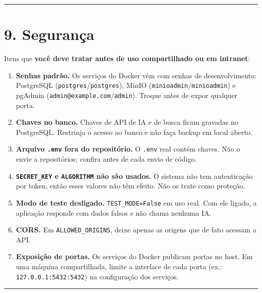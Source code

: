 \documentclass[
  brazilian,
  a4paper,12pt,oneside]{report}
\providecommand{\tightlist}{%
  \setlength{\itemsep}{0pt}\setlength{\parskip}{0pt}}
\begin{document}
\begin{center}\rule{0.5\linewidth}{0.5pt}\end{center}

\chapter{9. Segurança}\label{seguranuxe7a}

Itens que \textbf{você deve tratar antes de uso compartilhado ou em
intranet}:

\begin{enumerate}
\def\labelenumi{\arabic{enumi}.}
\tightlist
\item
  \textbf{Senhas padrão.} Os serviços do Docker vêm com senhas de
  desenvolvimento: PostgreSQL (\texttt{postgres}/\texttt{postgres}),
  MinIO (\texttt{minioadmin}/\texttt{minioadmin}) e pgAdmin
  (\texttt{admin@example.}\allowbreak{}\texttt{com}/\texttt{admin}).
  Troque antes de expor qualquer porta.
\item
  \textbf{Chaves no banco.} Chaves de API de IA e de busca ficam
  gravadas no PostgreSQL. Restrinja o acesso ao banco e não faça backup
  em local aberto.
\item
  \textbf{Arquivo \texttt{.}\allowbreak{}\texttt{env} fora do
  repositório.} O \texttt{.}\allowbreak{}\texttt{env} real contém
  chaves. Não o envie a repositórios; confira antes de cada envio de
  código.
\item
  \textbf{\texttt{SECRET\_}\allowbreak{}\texttt{KEY} e
  \texttt{ALGORITHM} não são usados.} O sistema não tem autenticação por
  token, então esses valores não têm efeito. Não os trate como proteção.
\item
  \textbf{Modo de teste desligado.}
  \texttt{TEST\_}\allowbreak{}\texttt{MODE=}\allowbreak{}\texttt{False}
  em uso real. Com ele ligado, a aplicação responde com dados falsos e
  não chama nenhuma IA.
\item
  \textbf{CORS.} Em \texttt{ALLOWED\_}\allowbreak{}\texttt{ORIGINS},
  deixe apenas as origens que de fato acessam a API.
\item
  \textbf{Exposição de portas.} Os serviços do Docker publicam portas no
  host. Em uma máquina compartilhada, limite a interface de cada porta
  (ex.:
  \texttt{127.}\allowbreak{}\texttt{0.}\allowbreak{}\texttt{0.}\allowbreak{}\texttt{1:}\allowbreak{}\texttt{5432:}\allowbreak{}\texttt{5432})
  na configuração dos serviços.
\end{enumerate}

\begin{center}\rule{0.5\linewidth}{0.5pt}\end{center}
\end{document}
